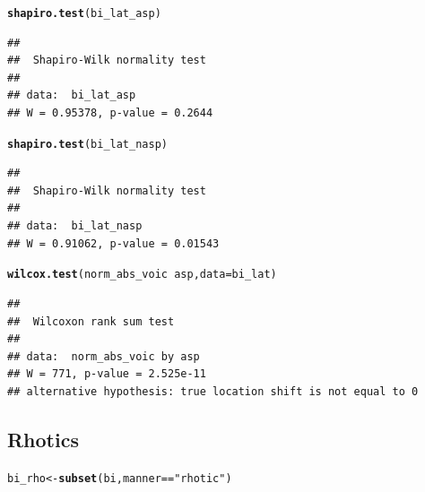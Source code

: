\documentclass[a4paper,11pt]{article}\usepackage[]{graphicx}\usepackage[]{color}
\makeatletter
\newcommand{\hlstr}[1]{\textcolor[rgb]{0.192,0.494,0.8}{#1}}%
\newcommand{\hlopt}[1]{\textcolor[rgb]{0,0,0}{#1}}%
\newcommand{\hlstd}[1]{\textcolor[rgb]{0.345,0.345,0.345}{#1}}%
\newcommand{\hlkwb}[1]{\textcolor[rgb]{0.69,0.353,0.396}{#1}}%
\newcommand{\hlkwc}[1]{\textcolor[rgb]{0.333,0.667,0.333}{#1}}%
\newcommand{\hlkwd}[1]{\textcolor[rgb]{0.737,0.353,0.396}{\textbf{#1}}}%
\newenvironment{kframe}{%
 \def\at@end@of@kframe{}%
 \ifinner\ifhmode%
  \def\at@end@of@kframe{\end{minipage}}%
  \begin{minipage}{\columnwidth}%
 \fi\fi%
 \def\FrameCommand##1{\hskip\@totalleftmargin \hskip-\fboxsep
 \colorbox{shadecolor}{##1}\hskip-\fboxsep
     \hskip-\linewidth \hskip-\@totalleftmargin \hskip\columnwidth}%
 \MakeFramed {\advance\hsize-\width
   \@totalleftmargin\z@ \linewidth\hsize
   \@setminipage}}%
 {\par\unskip\endMakeFramed%
 \at@end@of@kframe}
\newenvironment{knitrout}{}{} %
\makeatother
\begin{document}
\begin{knitrout}
\color{fgcolor}\begin{kframe}
\begin{alltt}
\hlkwd{shapiro.test}\hlstd{(bi_lat_asp)}
\end{alltt}
\begin{verbatim}
## 
## 	Shapiro-Wilk normality test
## 
## data:  bi_lat_asp
## W = 0.95378, p-value = 0.2644
\end{verbatim}
\begin{alltt}
\hlkwd{shapiro.test}\hlstd{(bi_lat_nasp)}
\end{alltt}
\begin{verbatim}
## 
## 	Shapiro-Wilk normality test
## 
## data:  bi_lat_nasp
## W = 0.91062, p-value = 0.01543
\end{verbatim}
\begin{alltt}
\hlkwd{wilcox.test}\hlstd{(norm_abs_voic} \hlopt{~} \hlstd{asp,} \hlkwc{data} \hlstd{= bi_lat)}
\end{alltt}
\begin{verbatim}
## 
## 	Wilcoxon rank sum test
## 
## data:  norm_abs_voic by asp
## W = 771, p-value = 2.525e-11
## alternative hypothesis: true location shift is not equal to 0
\end{verbatim}
\end{kframe}
\end{knitrout}

\subsection{Rhotics}

\begin{knitrout}
\color{fgcolor}\begin{kframe}
\begin{alltt}
\hlstd{bi_rho} \hlkwb{<-} \hlkwd{subset}\hlstd{(bi, manner} \hlopt{==} \hlstr{"rhotic"}\hlstd{)}
\end{alltt}
\end{kframe}
\end{knitrout}
\end{document}
